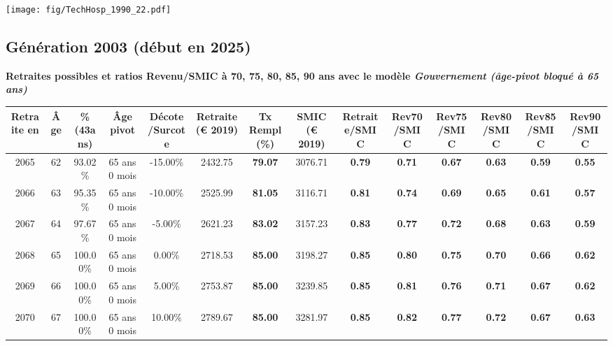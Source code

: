  \vspace{0.1cm} 

 \begin{center}\texttt{[image: fig/TechHosp\_1990\_22.pdf]}\end{center} \label{fig/TechHosp_1990_22.pdf} 

\newpage 
 
\subsection{Génération 2003 (début en 2025)} 

{\bf \noindent Retraites possibles et ratios Revenu/SMIC à 70, 75, 80, 85, 90 ans avec le modèle \emph{Gouvernement (âge-pivot bloqué à 65 ans)}}  
 
\begin{adjustbox}{max width=\textwidth} 
\begin{tabular}[htb]{|c|c||c|c|c||c|c||c||c|c|c|c|c|c|} 
\hline 
 Retraite en &  Âge &  \%(43ans) &  Âge pivot &  Décote/Surcote &  Retraite (\euro{} 2019) &  Tx Rempl(\%) &  SMIC (\euro{} 2019) &  Retraite/SMIC &  Rev70/SMIC &  Rev75/SMIC &  Rev80/SMIC &  Rev85/SMIC &  Rev90/SMIC \\ 
\hline \hline 
 2065 &  62 &  93.02\% &  65 ans 0 mois &  -15.00\% &  2432.75 &  {\bf 79.07} &  3076.71 &  {\bf {\color{red} 0.79}} &  {\bf {\color{red} 0.71}} &  {\bf {\color{red} 0.67}} &  {\bf {\color{red} 0.63}} &  {\bf {\color{red} 0.59}} &  {\bf {\color{red} 0.55}} \\ 
\hline 
 2066 &  63 &  95.35\% &  65 ans 0 mois &  -10.00\% &  2525.99 &  {\bf 81.05} &  3116.71 &  {\bf {\color{red} 0.81}} &  {\bf {\color{red} 0.74}} &  {\bf {\color{red} 0.69}} &  {\bf {\color{red} 0.65}} &  {\bf {\color{red} 0.61}} &  {\bf {\color{red} 0.57}} \\ 
\hline 
 2067 &  64 &  97.67\% &  65 ans 0 mois &  -5.00\% &  2621.23 &  {\bf 83.02} &  3157.23 &  {\bf {\color{red} 0.83}} &  {\bf {\color{red} 0.77}} &  {\bf {\color{red} 0.72}} &  {\bf {\color{red} 0.68}} &  {\bf {\color{red} 0.63}} &  {\bf {\color{red} 0.59}} \\ 
\hline 
 2068 &  65 &  100.00\% &  65 ans 0 mois &  0.00\% &  2718.53 &  {\bf 85.00} &  3198.27 &  {\bf {\color{red} 0.85}} &  {\bf {\color{red} 0.80}} &  {\bf {\color{red} 0.75}} &  {\bf {\color{red} 0.70}} &  {\bf {\color{red} 0.66}} &  {\bf {\color{red} 0.62}} \\ 
\hline 
 2069 &  66 &  100.00\% &  65 ans 0 mois &  5.00\% &  2753.87 &  {\bf 85.00} &  3239.85 &  {\bf {\color{red} 0.85}} &  {\bf {\color{red} 0.81}} &  {\bf {\color{red} 0.76}} &  {\bf {\color{red} 0.71}} &  {\bf {\color{red} 0.67}} &  {\bf {\color{red} 0.62}} \\ 
\hline 
 2070 &  67 &  100.00\% &  65 ans 0 mois &  10.00\% &  2789.67 &  {\bf 85.00} &  3281.97 &  {\bf {\color{red} 0.85}} &  {\bf {\color{red} 0.82}} &  {\bf {\color{red} 0.77}} &  {\bf {\color{red} 0.72}} &  {\bf {\color{red} 0.67}} &  {\bf {\color{red} 0.63}} \\ 
\hline 
\hline 
\end{tabular} 
\end{adjustbox} 
 
